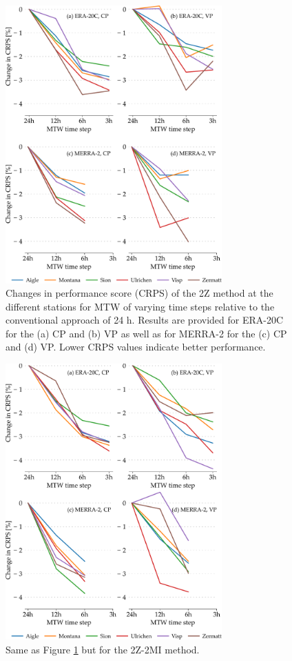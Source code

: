 \documentclass[hess, manuscript]{copernicus}
\begin{document}
	\begin{figure}[htb]
		\includegraphics[width=8.3cm]{fig09.pdf}
		\caption{Changes in performance score (CRPS) of the 2Z method at the different stations for MTW of varying time steps relative to the conventional approach of 24 h. Results are provided for ERA-20C for the (a) CP and (b) VP as well as for MERRA-2 for the (c) CP and (d) VP. Lower CRPS values indicate better performance.}
		\label{fig:plots_CRPS_2Z}
	\end{figure}

	\begin{figure}[htb]
		\includegraphics[width=8.3cm]{fig10.pdf}
		\caption{Same as Figure \ref{fig:plots_CRPS_2Z} but for the 2Z-2MI method.}
		\label{fig:plots_CRPS_2Z-2MI}
	\end{figure}
\end{document}
